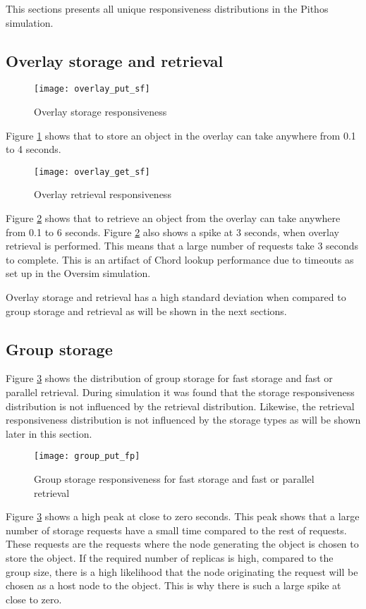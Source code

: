 This sections presents all unique responsiveness distributions in the Pithos simulation.

\subsection{Overlay storage and retrieval}

\begin{figure}[htbp]
 \centering
 \texttt{[image: overlay\_put\_sf]}
 \caption{Overlay storage responsiveness}
 \label{fig_overlay_put_sf}
\end{figure}
%
Figure \ref{fig_overlay_put_sf} shows that to store an object in the overlay can take anywhere from 0.1 to 4 seconds. 

\begin{figure}[htbp]
 \centering
 \texttt{[image: overlay\_get\_sf]}
 \caption{Overlay retrieval responsiveness}
 \label{fig_overlay_get_sf}
\end{figure}
%
Figure \ref{fig_overlay_get_sf} shows that to retrieve an object from the overlay can take anywhere from 0.1 to 6 seconds. Figure \ref{fig_overlay_get_sf} also shows a spike at 3 seconds, when overlay retrieval is performed. This means that a large number of requests take 3 seconds to complete. This is an artifact of Chord lookup performance due to timeouts as set up in the Oversim simulation.

Overlay storage and retrieval has a high standard deviation when compared to group storage and retrieval as will be shown in the next sections.


\subsection{Group storage}

Figure \ref{fig_group_put_fp} shows the distribution of group storage for fast storage and fast or parallel retrieval. During simulation it was found that the storage responsiveness distribution is not influenced by the retrieval distribution. Likewise, the retrieval responsiveness distribution is not influenced by the storage types as will be shown later in this section.

\begin{figure}[htbp]
 \centering
 \texttt{[image: group\_put\_fp]}
 \caption{Group storage responsiveness for fast storage and fast or parallel retrieval}
 \label{fig_group_put_fp}
\end{figure}
%
Figure \ref{fig_group_put_fp} shows a high peak at close to zero seconds. This peak shows that a large number of storage requests have a small time compared to the rest of requests. These requests are the requests where the node generating the object is chosen to store the object. If the required number of replicas is high, compared to the group size, there is a high likelihood that the node originating the request will be chosen as a host node to the object. This is why there is such a large spike at close to zero.

